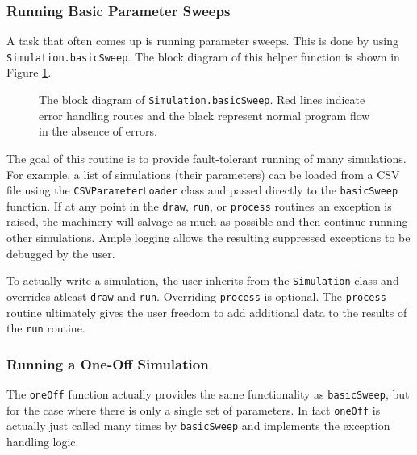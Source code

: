 \documentclass[12pt]{article}
\begin{document}
\subsubsection{Running Basic Parameter Sweeps}
A task that often comes up is running parameter sweeps. This is done by using \texttt{Simulation.basicSweep}. The block diagram of this helper function is shown in Figure \ref{fig.basic_sweep_blocks}.
\begin{figure}
\caption{The block diagram of \texttt{Simulation.basicSweep}. Red lines indicate error handling routes and the black represent normal program flow in the absence of errors.}
\label{fig.basic_sweep_blocks}
\end{figure}
The goal of this routine is to provide fault-tolerant running of many simulations. For example, a list of simulations (their parameters) can be loaded from a CSV file using the \texttt{CSVParameterLoader} class and passed directly to the \texttt{basicSweep} function. If at any point in the \texttt{draw}, \texttt{run}, or \texttt{process} routines an exception is raised, the machinery will salvage as much as possible and then continue running other simulations. Ample logging allows the resulting suppressed exceptions to be debugged by the user. 

To actually write a simulation, the user inherits from the \texttt{Simulation} class and overrides atleast \texttt{draw} and \texttt{run}. Overriding \texttt{process} is optional. The \texttt{process} routine ultimately gives the user freedom to add additional data to the results of the \texttt{run} routine.

\subsubsection{Running a One-Off Simulation}
The \texttt{oneOff} function actually provides the same functionality as \texttt{basicSweep}, but for the case where there is only a single set of parameters. In fact \texttt{oneOff} is actually just called many times by \texttt{basicSweep} and implements the exception handling logic.
\end{document}
